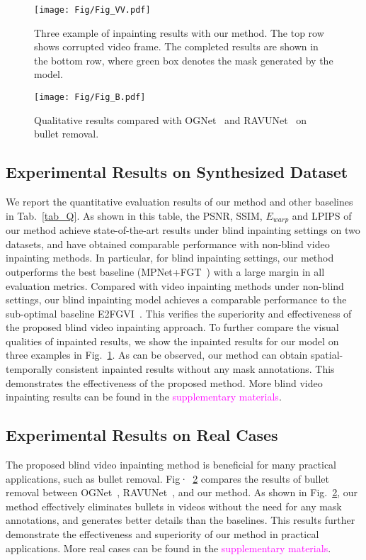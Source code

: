 \begin{figure}[tb]
\centering%
\texttt{[image: Fig/Fig\_VV.pdf]}
\vspace{-0.5cm}
\caption{Three example of inpainting results with our method. The top row shows corrupted video frame. The completed results are shown in the bottom row, where green box denotes the mask generated by the model.}
\label{Fig6}
\end{figure}

\begin{figure}[tb]
\centering%
\texttt{[image: Fig/Fig\_B.pdf]}
\vspace{-0.6cm}
\caption{Qualitative results compared with OGNet~\cite{phutke2023blind} and RAVUNet~\cite{agnolucci2022restoration} on bullet removal.}
\label{Fig_BIRC}
\vspace{-0.2cm}
\end{figure}

\subsection{Experimental Results on Synthesized Dataset}
We report the quantitative evaluation results of our method and other baselines in Tab.~\ref{tab_Q}. As shown in this table, the PSNR, SSIM, $E_{warp}$ and LPIPS of our method achieve state-of-the-art results under blind inpainting settings on two datasets, and have obtained comparable performance with non-blind video inpainting methods. In particular, for blind inpainting settings, our method outperforms the best baseline (MPNet+FGT~\cite{zhang2022flow}) with a large margin in all evaluation metrics. 
Compared with video inpainting methods under non-blind settings, our blind inpainting model achieves a comparable performance to the sub-optimal baseline E2FGVI~\cite{li2022towards}. 
This verifies the superiority and effectiveness of the proposed blind video inpainting approach.
To further compare the visual qualities of inpainted results,
we show the inpainted results for our model on three examples in Fig.~\ref{Fig6}. 
As can be observed, our method can obtain spatial-temporally consistent inpainted results without any mask annotations. 
This demonstrates the effectiveness of the proposed method. 
More blind video inpainting results can be found in the \textcolor{magenta}{supplementary materials}.


\subsection{Experimental Results on Real Cases}
The proposed blind video inpainting method is beneficial for many practical applications, such as bullet removal. Fig·~\ref{Fig_BIRC} compares the results of bullet removal between OGNet~\cite{phutke2023blind}, RAVUNet~\cite{agnolucci2022restoration}, and our method. As shown in Fig.~\ref{Fig_BIRC}, our method effectively eliminates bullets in videos without the need for any mask annotations, and generates better details than the baselines. This results further demonstrate the effectiveness and superiority of our method in practical applications. More real cases can be found in the \textcolor{magenta}{supplementary materials}.

